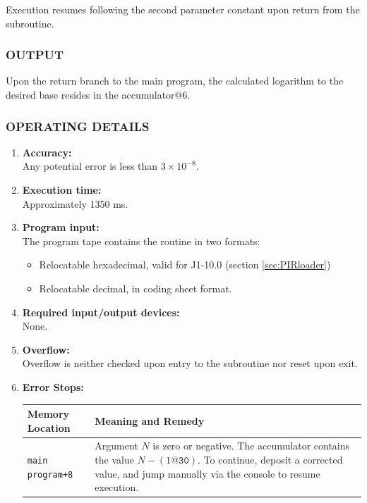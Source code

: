\documentclass{article}
\begin{document}
Execution resumes following the second parameter constant upon return from the subroutine.

\subsubsection*{OUTPUT}
\noindent
Upon the return branch to the main program, the calculated logarithm to the desired base resides in the accumulator$@6$.

\subsubsection*{OPERATING DETAILS}

\begin{enumerate}[leftmargin=1.5em, itemsep=6pt]
    \item \textbf{Accuracy:} \\
    Any potential error is less than $3 \times 10^{-8}$.

    \item \textbf{Execution time:} \\
    Approximately 1350 ms.

    \item \textbf{Program input:} \\
    The program tape contains the routine in two formats:
    \begin{itemize}
      \item Relocatable hexadecimal, valid for J1-10.0 (section \ref{sec:PIRloader})
        \item Relocatable decimal, in coding sheet format.
    \end{itemize}

    \item \textbf{Required input/output devices:} \\
    None.

    \item \textbf{Overflow:} \\
    Overflow is neither checked upon entry to the subroutine nor reset upon exit.

    \item \textbf{Error Stops:} \\
  \begin{tabular}{lp{9cm}} %
    \toprule
    \textbf{Memory Location} & \textbf{Meaning and Remedy} \\
    \midrule
    \texttt{main program+8}  & Argument $N$ is zero or negative. The accumulator contains the value $N - (1\texttt{@30})$. To continue, deposit a corrected value, and jump manually via the console to resume execution. \\
    \bottomrule
  \end{tabular}
\end{enumerate}
\end{document}
